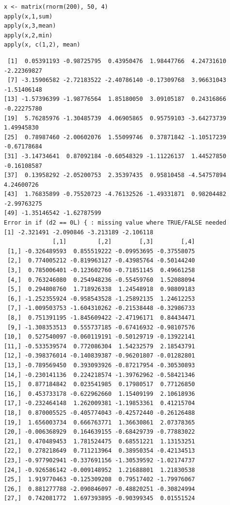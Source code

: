 \documentclass[11pt]{article}
\begin{document}
\begin{itemize}
\begin{verbatim}
x <- matrix(rnorm(200), 50, 4)
apply(x,1,sum)
apply(x,3,mean)
apply(x,2,min)
apply(x, c(1,2), mean)
\end{verbatim}


\begin{verbatim}
 [1]  0.05391193 -0.98725795  0.43950476  1.98447766  4.24731610 -2.22369827
 [7] -3.15906582 -2.72183522 -2.40786140 -0.17309768  3.96631043 -1.51406148
[13] -1.57396399 -1.98776564  1.85180050  3.09105187  0.24316866 -0.22275780
[19]  5.76285976 -1.30485739  4.06905865  0.95759103 -3.64273739  1.49945830
[25]  0.78987460 -2.00602076  1.55099746  0.37871842 -1.10517239 -0.67178684
[31] -3.14734641  0.87092184 -0.60548329 -1.11226137  1.44527850 -0.16108587
[37]  0.13958292 -2.05200753  2.35397435  0.95810458 -4.54757894  4.24600726
[43]  1.76835899 -0.75520723 -4.76132526 -1.49331871  0.98204482 -2.99763275
[49] -1.35146542 -1.62787599
Error in if (d2 == 0L) { : missing value where TRUE/FALSE needed
[1] -2.321491 -2.090846 -3.213189 -2.106118
              [,1]         [,2]        [,3]        [,4]
 [1,] -0.326489593  0.855519222 -0.09953695 -0.37558075
 [2,]  0.774005212 -0.819963127 -0.43985764 -0.50144240
 [3,]  0.785006401 -0.123602760 -0.71851145  0.49661258
 [4,]  0.763246080  0.254948236 -0.55459760  1.52088094
 [5,]  0.294808760  1.718926338  1.24548918  0.98809183
 [6,] -1.252355924 -0.958543528 -1.25892135  1.24612253
 [7,] -1.009503753 -1.604310262 -0.21538448 -0.32986733
 [8,]  0.751391195 -1.845609422 -2.47196171  0.84434471
 [9,] -1.308353513  0.555737185 -0.67416932 -0.98107576
[10,]  0.527540097 -0.060119191 -0.50129719 -0.13922141
[11,] -0.533539574  0.772086304  1.54232579  2.18543791
[12,] -0.398376014 -0.140839387 -0.96201807 -0.01282801
[13,] -0.789569450  0.393093926 -0.87217954 -0.30530893
[14,] -0.230141136  0.224218574 -1.39762962 -0.58421346
[15,]  0.877184842  0.023541985  0.17980517  0.77126850
[16,]  0.453733178 -0.622962660  1.15409199  2.10618936
[17,] -0.232464148  1.262009381 -1.19853361  0.41215704
[18,]  0.870005525 -0.405774043 -0.42572440 -0.26126488
[19,]  1.656003734  0.666763771  1.36630861  2.07378365
[20,] -0.006368929  0.164639155 -0.68429739 -0.77883022
[21,]  0.470489453  1.781524475  0.68551221  1.13153251
[22,]  0.278218649  0.711213964  0.38950354 -0.42134513
[23,] -0.977902941 -0.337691156 -1.30539592 -1.02174737
[24,] -0.926586142 -0.009148952  1.21688801  1.21830538
[25,]  1.919770463 -0.125309208  0.79517402 -1.79976067
[26,]  0.881277788 -2.090846097 -0.48820251 -0.30824994
[27,]  0.742081772  1.697393895 -0.90399345  0.01551524

\end{verbatim}
\end{itemize}
\end{document}
